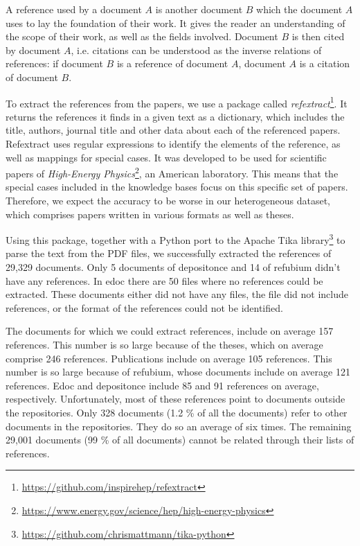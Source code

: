 A reference used by a document $A$ is another document $B$ which the document $A$ uses to lay the foundation of their work. It gives the reader an understanding of the scope of their work, as well as the fields involved. Document $B$ is then cited by document $A$, i.e. citations can be understood as the inverse relations of references: if document $B$ is a reference of document $A$, document $A$ is a citation of document $B$.

To extract the references from the papers, we use a package called \textit{refextract}\footnote{\url{https://github.com/inspirehep/refextract}}. It returns the references it finds in a given text as a dictionary, which includes the title, authors, journal title and other data about each of the referenced papers. Refextract uses regular expressions to identify the elements of the reference, as well as mappings for special cases. It was developed to be used for scientific papers of \textit{High-Energy Physics}\footnote{\url{https://www.energy.gov/science/hep/high-energy-physics}}, an American laboratory. This means that the special cases included in the knowledge bases focus on this specific set of papers. Therefore, we expect the accuracy to be worse in our heterogeneous dataset, which comprises papers written in various formats as well as theses.
 
Using this package, together with a Python port to the Apache Tika library\footnote{\url{https://github.com/chrismattmann/tika-python}} to parse the text from the PDF files, we successfully extracted the references of 29,329 documents. Only 5 documents of depositonce and 14 of refubium didn't have any references. In edoc there are 50 files where no references could be extracted. These documents either did not have any files, the file did not include references, or the format of the references could not be identified.

The documents for which we could extract references, include on average 157 references. This number is so large because of the theses, which on average comprise 246 references. Publications include on average 105 references. This number is so large because of refubium, whose documents include on average 121 references. Edoc and depositonce include 85 and 91 references on average, respectively. Unfortunately, most of these references point to documents outside the repositories. Only 328 documents (1.2 \% of all the documents) refer to other documents in the repositories. They do so an average of six times. The remaining 29,001 documents (99 \% of all documents) cannot be related through their lists of references.

